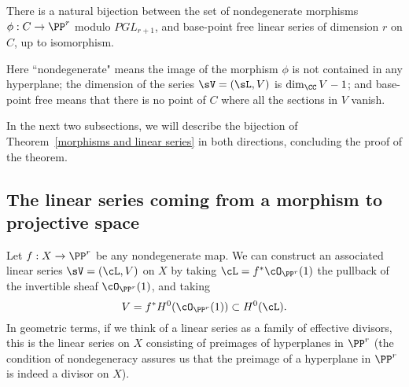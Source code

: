 \begin{theorem}\label{morphisms and linear series}
There is a natural bijection between the set of nondegenerate morphisms $\phi : C \to \PP^r$ modulo $PGL_{r+1}$, and base-point free linear series of dimension $r$ on $C$, up to isomorphism.
\end{theorem}

Here ``nondegenerate" means the image of the morphism $\phi$ is not contained in any hyperplane; the dimension of the series
 $\sV  = (\sL, V)$ is $\dim_\CC V -1$; and base-point free means that there is no point of $C$ where all the sections in $V$
vanish.

In the next two subsections, we will describe the bijection of Theorem~\ref{morphisms and linear series} in both directions, concluding the proof of the theorem.

\subsection{The linear series coming from a morphism to projective space}\label{series from morphism}

Let $f : X \to \PP^r$ be any nondegenerate map. We can construct an associated linear series $\sV = (\cL, V)$ on $X$ by taking $\cL = f^*\cO_{\PP^r}(1)$ the pullback of the invertible sheaf $\cO_{\PP^r}(1)$, and taking
$$
V = f^*H^0(\cO_{\PP^r}(1)) \subset H^0(\cL).
$$
In geometric terms, if we think of a linear series as a family of effective divisors, this is the linear series on $X$ consisting of preimages of hyperplanes in $\PP^r$ (the condition of nondegeneracy assures us that the preimage of a hyperplane in $\PP^r$ is indeed a divisor on $X$).

%



